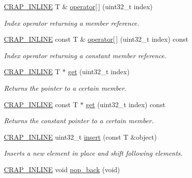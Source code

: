 \begin{DoxyCompactItemize}
\hyperlink{config__x86_8h_a5a40526b8d842e7ff731509998bb0f1c}{C\+R\+A\+P\+\_\+\+I\+N\+L\+I\+N\+E} T \& \hyperlink{classcrap_1_1sorted__array_a7e79056988befaef9bafaf83b889f39c}{operator\mbox{[}$\,$\mbox{]}} (uint32\+\_\+t index)
\begin{DoxyCompactList}\small\item\em Index operator returning a member reference. \end{DoxyCompactList}\item 
\hyperlink{config__x86_8h_a5a40526b8d842e7ff731509998bb0f1c}{C\+R\+A\+P\+\_\+\+I\+N\+L\+I\+N\+E} const T \& \hyperlink{classcrap_1_1sorted__array_a51bb152c1698d83bca43b2be14489098}{operator\mbox{[}$\,$\mbox{]}} (uint32\+\_\+t index) const 
\begin{DoxyCompactList}\small\item\em Index operator returning a constant member reference. \end{DoxyCompactList}\item 
\hyperlink{config__x86_8h_a5a40526b8d842e7ff731509998bb0f1c}{C\+R\+A\+P\+\_\+\+I\+N\+L\+I\+N\+E} T $\ast$ \hyperlink{classcrap_1_1sorted__array_ad7ad4afd75618637a3ce602c9ef35c53}{get} (uint32\+\_\+t index)
\begin{DoxyCompactList}\small\item\em Returns the pointer to a certain member. \end{DoxyCompactList}\item 
\hyperlink{config__x86_8h_a5a40526b8d842e7ff731509998bb0f1c}{C\+R\+A\+P\+\_\+\+I\+N\+L\+I\+N\+E} const T $\ast$ \hyperlink{classcrap_1_1sorted__array_ab2794eb1badb682879d1e7e26bef4fa6}{get} (uint32\+\_\+t index) const 
\begin{DoxyCompactList}\small\item\em Returns the constant pointer to a certain member. \end{DoxyCompactList}\item 
\hyperlink{config__x86_8h_a5a40526b8d842e7ff731509998bb0f1c}{C\+R\+A\+P\+\_\+\+I\+N\+L\+I\+N\+E} uint32\+\_\+t \hyperlink{classcrap_1_1sorted__array_a7b6e539b39a094c918f3c3f60749eab6}{insert} (const T \&object)
\begin{DoxyCompactList}\small\item\em Inserts a new element in place and shift following elements. \end{DoxyCompactList}\item 
\hyperlink{config__x86_8h_a5a40526b8d842e7ff731509998bb0f1c}{C\+R\+A\+P\+\_\+\+I\+N\+L\+I\+N\+E} void \hyperlink{classcrap_1_1sorted__array_a0dcea6e2e1958df560c4277c68d56173}{pop\+\_\+back} (void)

\end{DoxyCompactItemize}
